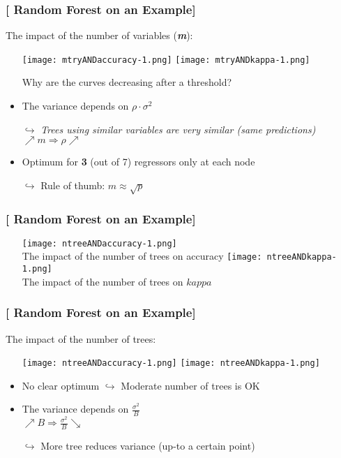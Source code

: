 \documentclass[xcolor=x11names,compress, handhouts]{beamer}
\renewcommand{\(}{\begin{columns}}
\renewcommand{\)}{\end{columns}}
\newcommand{\<}[1]{\begin{column}{#1}}
\renewcommand{\>}{\end{column}}
\begin{document}
\begin{frame}
\frametitle{\textcolor{brique}{[ Random Forest on an Example]}}
The impact of the number of variables (\textbf{\textit{m}}):
\pause
\begin{itemize}[<+->]
    \item[] \texttt{[image: mtryANDaccuracy-1.png]} \texttt{[image: mtryANDkappa-1.png]}
    \item[] Why are the curves decreasing after a threshold?
    \item The variance depends on $\rho \cdot \sigma^{2}$
    \item[$\hookrightarrow$] \textit{Trees using similar variables are very similar (same predictions)} \\
    $\nearrow  m \Longrightarrow \rho \nearrow$\\
    \item Optimum for \textbf{3} (out of 7) regressors only at each node
   \item[$\hookrightarrow$] Rule of thumb: $m \approx \sqrt{p}$
\end{itemize}
\end{frame}



\begin{frame}
\frametitle{\textcolor{brique}{[ Random Forest on an Example]}}
\pause
\begin{itemize}
\item[]
    {\texttt{[image: ntreeANDaccuracy-1.png]}\\  }
    {The impact of the number of trees on accuracy}
    {\texttt{[image: ntreeANDkappa-1.png]}\\ }
    {The impact of the number of trees on $kappa$ }
\end{itemize}
\end{frame}


\begin{frame}
\frametitle{\textcolor{brique}{[ Random Forest on an Example]}}
The impact of the number of trees:
\pause
\begin{itemize}[<+->]
    \item[] \texttt{[image: ntreeANDaccuracy-1.png]} \texttt{[image: ntreeANDkappa-1.png]}
    \item No clear optimum $\hookrightarrow$ Moderate number of trees is OK
    \item The variance depends on $\frac{\sigma^{2}}{B}$ \\
    $\nearrow  B \Longrightarrow \frac{\sigma^{2}}{B}  \searrow $\\
   \item[$\hookrightarrow$] More tree reduces variance (up-to a certain point)
\end{itemize}
\end{frame}
\end{document}
